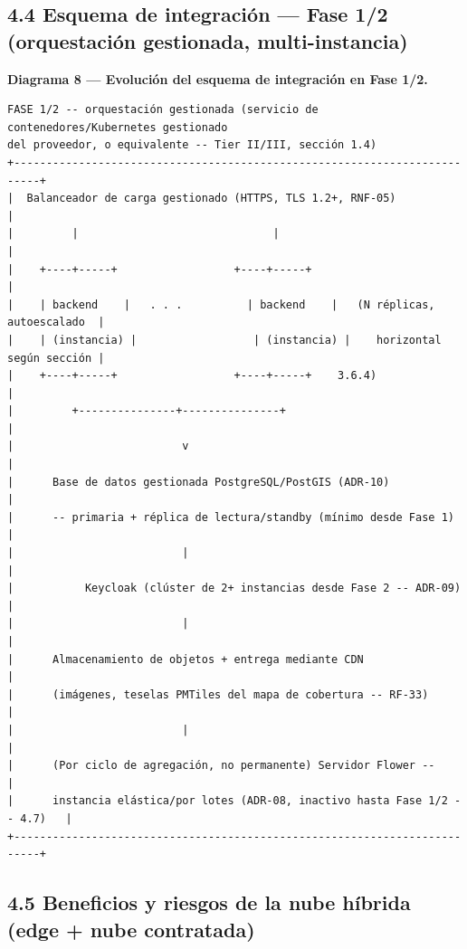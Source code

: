\documentclass[11pt,a4paper]{article}
\begin{document}
\subsection{4.4 Esquema de integración --- Fase 1/2 (orquestación gestionada, multi-instancia)}\label{esquema-de-integraciuxf3n-fase-12-orquestaciuxf3n-gestionada-multi-instancia}

\textbf{Diagrama 8 --- Evolución del esquema de integración en Fase 1/2.}

\begin{samepage}\begin{verbatim}
FASE 1/2 -- orquestación gestionada (servicio de contenedores/Kubernetes gestionado
del proveedor, o equivalente -- Tier II/III, sección 1.4)
+--------------------------------------------------------------------------+
|  Balanceador de carga gestionado (HTTPS, TLS 1.2+, RNF-05)                   |
|         |                              |                                     |
|    +----+-----+                  +----+-----+                              |
|    | backend    |   . . .          | backend    |   (N réplicas, autoescalado  |
|    | (instancia) |                  | (instancia) |    horizontal según sección |
|    +----+-----+                  +----+-----+    3.6.4)                     |
|         +---------------+---------------+                                    |
|                          v                                                   |
|      Base de datos gestionada PostgreSQL/PostGIS (ADR-10)                     |
|      -- primaria + réplica de lectura/standby (mínimo desde Fase 1)          |
|                          |                                                   |
|           Keycloak (clúster de 2+ instancias desde Fase 2 -- ADR-09)          |
|                          |                                                   |
|      Almacenamiento de objetos + entrega mediante CDN                        |
|      (imágenes, teselas PMTiles del mapa de cobertura -- RF-33)              |
|                          |                                                   |
|      (Por ciclo de agregación, no permanente) Servidor Flower --              |
|      instancia elástica/por lotes (ADR-08, inactivo hasta Fase 1/2 -- 4.7)   |
+--------------------------------------------------------------------------+
\end{verbatim}\end{samepage}

\subsection{4.5 Beneficios y riesgos de la nube híbrida (edge + nube contratada)}\label{beneficios-y-riesgos-de-la-nube-huxedbrida-edge-nube-contratada}
\end{document}
